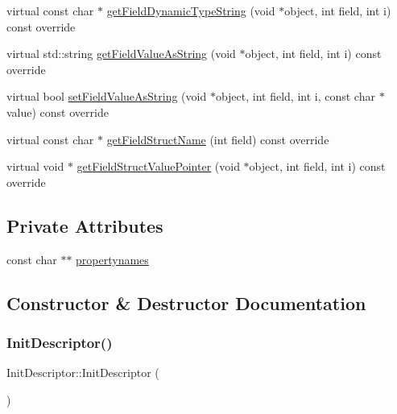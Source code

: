 \begin{DoxyCompactItemize}
\item 
virtual const char $\ast$ \hyperlink{classInitDescriptor_a93d85a84c15e095b2eb7b39b2b392837}{get\+Field\+Dynamic\+Type\+String} (void $\ast$object, int field, int i) const override
\item 
virtual std\+::string \hyperlink{classInitDescriptor_a94c8aa0ca2f12dff66033c5320e944bb}{get\+Field\+Value\+As\+String} (void $\ast$object, int field, int i) const override
\item 
virtual bool \hyperlink{classInitDescriptor_af57482db7fb146d3da8b790900a3f96e}{set\+Field\+Value\+As\+String} (void $\ast$object, int field, int i, const char $\ast$value) const override
\item 
virtual const char $\ast$ \hyperlink{classInitDescriptor_a13c89c76ac3273c48418e94eab1c88b0}{get\+Field\+Struct\+Name} (int field) const override
\item 
virtual void $\ast$ \hyperlink{classInitDescriptor_a40bdb3ccca5709afd21ab2a2bf12b5e0}{get\+Field\+Struct\+Value\+Pointer} (void $\ast$object, int field, int i) const override
\end{DoxyCompactItemize}
\subsection*{Private Attributes}
\begin{DoxyCompactItemize}
\item 
const char $\ast$$\ast$ \hyperlink{classInitDescriptor_a070498d1650ac65184f35f6449f7cd5d}{propertynames}
\end{DoxyCompactItemize}


\subsection{Constructor \& Destructor Documentation}
\mbox{\label{classInitDescriptor_ab339ad8c646e3ebd54fca1d423669bcc}} 
\subsubsection{\texorpdfstring{Init\+Descriptor()}{InitDescriptor()}}
{\footnotesize\ttfamily Init\+Descriptor\+::\+Init\+Descriptor (\begin{DoxyParamCaption}{ }\end{DoxyParamCaption})}

